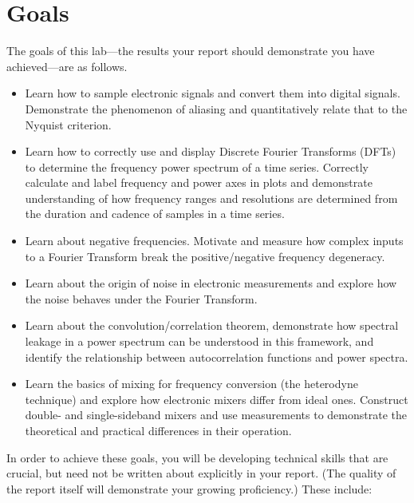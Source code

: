 \documentclass[11pt,preprint]{aastex}
\begin{document}
\section{Goals} \label{goals}

\noindent
The goals of this lab---the results your report should
demonstrate you have achieved---are as follows.

\begin{itemize}

\item Learn how to sample electronic signals and convert them into digital signals. Demonstrate
the phenomenon of aliasing and quantitatively relate that to the Nyquist criterion.

\item Learn how to correctly use and display Discrete Fourier Transforms (DFTs) to 
  determine the frequency power spectrum of a time
  series. Correctly calculate and label frequency and power axes in plots and demonstrate
  understanding of how frequency ranges and resolutions are determined from the duration and 
  cadence of samples in a time series.

\item Learn about negative frequencies. Motivate and measure how complex inputs to a Fourier Transform
break the positive/negative frequency degeneracy.


\item Learn about the origin of noise in electronic measurements and explore how the noise behaves 
  under the Fourier Transform.

\item Learn about the convolution/correlation theorem, demonstrate how
  spectral leakage in a power spectrum can be understood in this framework,
  and identify the relationship between 
  autocorrelation functions and power spectra.

\item Learn the basics of mixing for frequency conversion
  (the heterodyne technique) and explore how electronic mixers differ from
  ideal ones. Construct double- and single-sideband mixers and use measurements
  to demonstrate the theoretical and practical differences in their operation.

\end{itemize}

\noindent
In order to achieve these goals, you will be developing technical skills that are
crucial, but need not be written about explicitly in your report. (The quality of
the report itself will demonstrate your growing proficiency.) These include:
\end{document}
